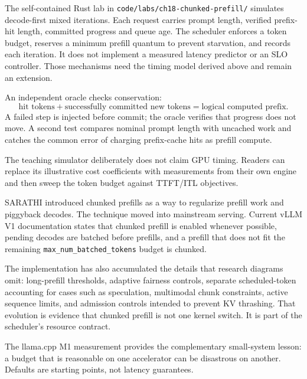 
The self-contained Rust lab in \texttt{code/labs/ch18-chunked-prefill/} simulates
decode-first mixed iterations. Each request carries prompt length, verified prefix-hit
length, committed progress and queue age. The scheduler enforces a token budget,
reserves a minimum prefill quantum to prevent starvation, and records each iteration.
It does not implement a measured latency predictor or an SLO controller.
Those mechanisms need the timing model derived above and remain an extension.

An independent oracle checks conservation:
\[
\text{hit tokens}+\text{successfully committed new tokens}
=\text{logical computed prefix}.
\]
A failed step is injected before commit; the oracle verifies that progress does not
move. A second test compares nominal prompt length with uncached work and catches the
common error of charging prefix-cache hits as prefill compute.

The teaching simulator deliberately does not claim GPU timing. Readers can replace its
illustrative cost coefficients with measurements from their own engine and then sweep
the token budget against TTFT/ITL objectives.


SARATHI introduced chunked prefills as a way to regularize prefill work and piggyback
decodes. The technique moved into mainstream serving. Current vLLM V1 documentation
states that chunked prefill is enabled whenever possible, pending decodes are batched
before prefills, and a prefill that does not fit the remaining
\texttt{max\_num\_batched\_tokens} budget is chunked.

The implementation has also accumulated the details that research diagrams omit:
long-prefill thresholds, adaptive fairness controls, separate scheduled-token
accounting for cases such as speculation, multimodal chunk constraints, active
sequence limits, and admission controls intended to prevent KV thrashing. That
evolution is evidence that chunked prefill is not one kernel switch. It is part of
the scheduler's resource contract.

The llama.cpp M1 measurement provides the complementary small-system lesson: a budget
that is reasonable on one accelerator can be disastrous on another. Defaults are
starting points, not latency guarantees.


